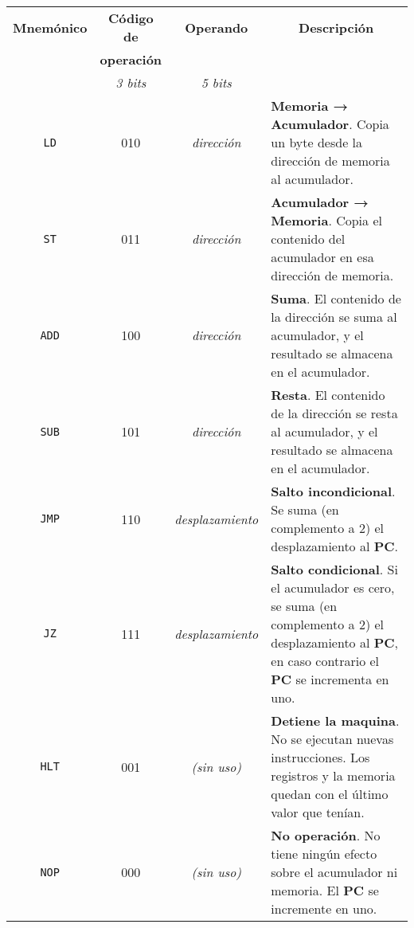 \documentclass[12pt]{article}
\begin{document}
\begin{tabularx}{\textwidth}{c|c|c|X}

    \textbf{Mnemónico} & \textbf{Código de} & \textbf{Operando} &
    \multicolumn{1}{c}{\textbf{Descripción}} \\

    & \textbf{operación} & & \\

    & \emph{3 bits} & \emph{5 bits} & \\
    \hline
    \hline

    \texttt{LD} & 010 & \emph{dirección} & \textbf{Memoria → Acumulador}. Copia
    un byte desde la dirección de memoria al acumulador. \\ \hline

    \texttt{ST} & 011 & \emph{dirección} & \textbf{Acumulador → Memoria}. Copia
    el contenido del acumulador en esa dirección de memoria. \\ \hline

    \texttt{ADD} & 100 & \emph{dirección} & \textbf{Suma}. El contenido de la
    dirección se suma al acumulador, y el resultado se almacena en el
    acumulador. \\ \hline

    \texttt{SUB} & 101 & \emph{dirección} & \textbf{Resta}. El contenido de la
    dirección se resta al acumulador, y el resultado se almacena en el
    acumulador. \\ \hline

    \texttt{JMP} & 110 & \emph{desplazamiento} & \textbf{Salto incondicional}. Se
    suma (en complemento a 2) el desplazamiento al \textbf{PC}. \\ \hline

    \texttt{JZ} & 111 & \emph{desplazamiento} & \textbf{Salto condicional}. Si
    el acumulador es cero, se suma (en complemento a 2) el desplazamiento al
    \textbf{PC}, en caso contrario el \textbf{PC} se incrementa en uno. \\
    \hline

    \texttt{HLT} & 001 & \emph{(sin uso)} & \textbf{Detiene la maquina}. No se
    ejecutan nuevas instrucciones. Los registros y la memoria quedan con el
    último valor que tenían. \\ \hline

    \texttt{NOP} & 000 & \emph{(sin uso)} & \textbf{No operación}. No tiene
    ningún efecto sobre el acumulador ni memoria. El \textbf{PC} se incremente
    en uno. \\

\end{tabularx}
\end{document}
